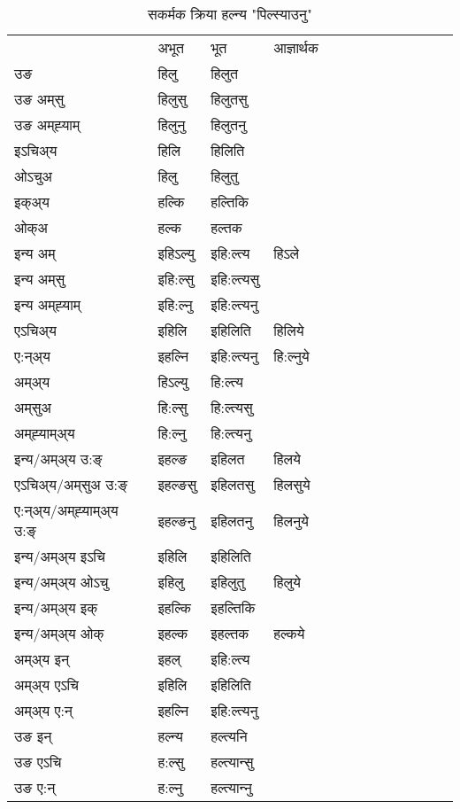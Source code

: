\begin{table}[H]
\centering
\caption{\label{il.vt} सकर्मक क्रिया  हल्न्य  "पिल्स्याउनु"  }
\begin{tabular}{l|l|l|l|l|l|l|l|l|l|l|l|l}  \toprule
&अभूत & भूत & आज्ञार्थक \\ 
उङ &हिलु &हिलुत \\ 
उङ अम्‌सु &हिलुसु &हिलुतसु \\ 
उङ अम्‌ह्‍याम् &हिलुनु &हिलुतनु \\ 
इऽचिअ्य &हिलि &हिलिति   \\ 
ओऽचुअ &हिलु &हिलुतु   \\ 
इक्अ्य &हल्कि &हल्तिकि   \\ 
ओक्अ &हल्क &हल्तक   \\ 
इन्य अम् & इहिऽल्यु  & इहि:ल्त्य &हिऽले  \\ 
इन्य अम्‌सु & इहि:ल्सु  & इहि:ल्त्यसु   \\ 
इन्य अम्‌ह्‍याम् & इहि:ल्नु  & इहि:ल्त्यनु   \\ 
एऽचिअ्य & इहिलि & इहिलिति &हिलिये    \\ 
ए:न्अ्य & इहल्नि  & इहि:ल्त्यनु &हि:ल्नुये  \\ 
अम्अ्य & हिऽल्यु  & हि:ल्त्य  \\ 
अम्‌सुअ & हि:ल्सु & हि:ल्त्यसु  \\ 
अम्‌ह्‍याम्अ्य & हि:ल्नु  & हि:ल्त्यनु \\ 
\midrule
इन्य/अम्अ्य उ:ङ्‌&इहल्ङ & इहिलत &हिलये \\ 
एऽचिअ्य/अम्‌सुअ उ:ङ्‌ &इहल्ङसु & इहिलतसु &हिलसुये \\ 
ए:न्अ्य/अम्‌ह्‍याम्अ्य उ:ङ्‌ &इहल्ङनु & इहिलतनु &हिलनुये \\ 
इन्य/अम्अ्य इऽचि & इहिलि & इहिलिति    \\ 
इन्य/अम्अ्य ओऽचु & इहिलु & इहिलुतु  &हिलुये  \\ 
इन्य/अम्अ्य इक् & इहल्कि & इहल्तिकि   \\ 
इन्य/अम्अ्य ओक् & इहल्क & इहल्तक  &हल्कये  \\ 
अम्अ्य इन् & इहल् & इहि:ल्त्य   \\ 
अम्अ्य एऽचि & इहिलि & इहिलिति    \\ 
अम्अ्य ए:न् & इहल्नि  & इहि:ल्त्यनु  \\ 
\midrule
उङ इन् & हल्न्य  & हल्त्यनि  \\ 
उङ एऽचि & ह:ल्सु  & हल्त्यान्सु   \\ 
उङ ए:न्& ह:ल्नु  & हल्त्यान्‍नु   \\ 
\bottomrule
\end{tabular}
\end{table}


